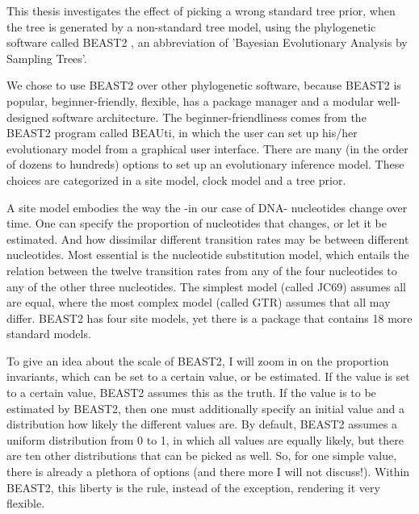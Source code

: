 %
%
%

This thesis investigates the effect of picking a wrong standard
tree prior, when the tree is generated 
by a non-standard tree model, using the phylogenetic software 
called BEAST2 \cite{beast2},
an abbreviation of 'Bayesian Evolutionary Analysis by Sampling Trees'.

%
%
%

We chose to use BEAST2 \cite{beast2} over other phylogenetic software,
because BEAST2 is popular, beginner-friendly, flexible, has a package manager
and a modular well-designed software architecture. The beginner-friendliness
comes from the BEAST2 program called BEAUti, in which the user can set up
his/her evolutionary model from a graphical user interface. There are many (in
the order of dozens to hundreds) options to set up an evolutionary inference model. 
These choices are categorized in a site model, clock model and a tree prior. 

%
%
%

A site model embodies the way the -in our case of DNA- nucleotides
change over time. One can specify the proportion of nucleotides
that changes, or let it be estimated. And how dissimilar different transition
rates may be between different nucleotides. Most essential is the nucleotide
substitution model, which entails the relation between the twelve transition 
rates from any of the four nucleotides to any of the other three nucleotides. 
The simplest model (called
JC69) assumes all are equal, where the most complex model (called GTR) assumes
that all may differ. BEAST2 has four site models, yet there is a package that
contains 18 more standard models.

To give an idea about the scale of BEAST2, I will zoom in on
the proportion invariants, which can be set to a certain value, or
be estimated. If the value is set to a certain value, BEAST2 assumes
this as the truth. If the value is to be estimated by BEAST2, then
one must additionally specify an initial value and 
a distribution how likely the different values are. 
By default, BEAST2 assumes a uniform distribution from 0 to 1, in
which all values are equally likely, but there are ten other distributions
that can be picked as well. So, for one simple value, there is already
a plethora of options (and there more I will not discuss!). 
Within BEAST2, this liberty is the rule, instead of the
exception, rendering it very flexible.

